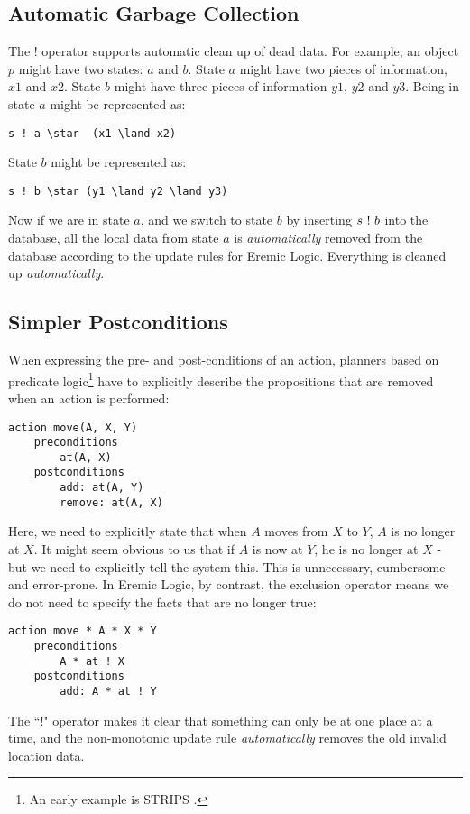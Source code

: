 \subsection{Automatic Garbage Collection}
The $!$ operator supports automatic clean up of dead data.
For example, an object $p$ might have two states: $a$ and $b$. State $a$ might have two pieces of information, $x1$ and $x2$. State $b$ might have three pieces of information $y1$, $y2$ and $y3$. Being in state $a$ might be represented as:
\begin{verbatim}
s ! a \star  (x1 \land x2)
\end{verbatim}
State $b$ might be represented as:
\begin{verbatim}
s ! b \star (y1 \land y2 \land y3)
\end{verbatim}
Now if we are in state $a$, and we switch to state $b$ by inserting $s \ ! \  b$ into the database, all the local data from  state $a$ is \emph{automatically} removed from the database according to the update rules for Eremic Logic. Everything is cleaned up \emph{automatically}.

\subsection{Simpler Postconditions}
When expressing the pre- and post-conditions of an action, planners based on predicate logic\footnote{An early example is STRIPS \cite{strips}.} have to explicitly describe the propositions that are removed when an action is performed:
\begin{verbatim}
action move(A, X, Y)
    preconditions
        at(A, X)
    postconditions
        add: at(A, Y) 
        remove: at(A, X)
\end{verbatim}
Here, we need to explicitly state that when $A$ moves from $X$ to $Y$, $A$ is no longer at $X$. It might seem obvious to us that if $A$ is now at $Y$, he is no longer at $X$ - but we need to explicitly tell the system this. This is unnecessary, cumbersome and error-prone. In Eremic Logic, by contrast, the exclusion operator means we do not need to specify the facts that are no longer true:
\begin{verbatim}
action move * A * X * Y
    preconditions
        A * at ! X
    postconditions
        add: A * at ! Y
\end{verbatim}
The ``!" operator makes it clear that something can only be at one place at a time, and the non-monotonic update rule \emph{automatically} removes the old invalid location data.

